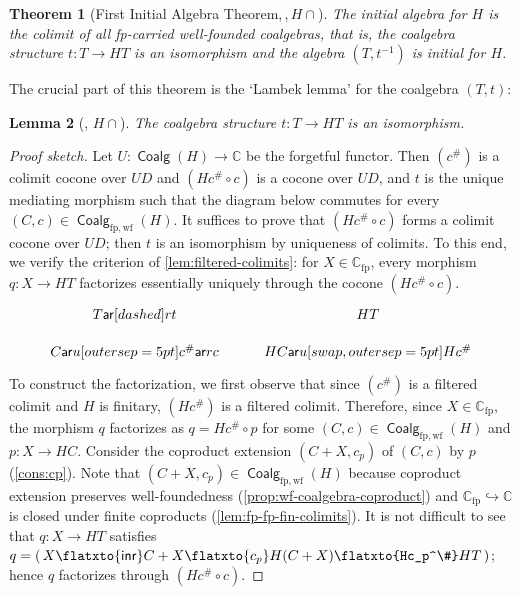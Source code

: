 \documentclass[10pt,a4paper]{article}
\newtheorem{theorem}{Theorem}[section]
\newtheorem{lemma}[theorem]{Lemma}
\theoremstyle{definition}
\theoremstyle{remark}
\numberwithin{equation}{section}
\providecommand{\oname}[1]{{\mathop{\mathsf{#1}}\xspace}}
\providecommand{\inr}{\oname{inr}}
\newcommand{\ar}{\mathsf{ar}}
\providecommand{\C}{}
\newcommand{\fp}{{\mathrm{fp}}}
\newcommand{\wf}{{\mathrm{wf}}}
\newcommand{\fwf}{\Coalg_{\fp,\wf}(H)}
\renewcommand{\C}{{\mathbb{C}}}
\DeclareMathOperator{\Coalg}{\mathsf{Coalg}}
\newcommand{\subto}{\hookrightarrow}
\newcommand{\injmono}{\ensuremath{\overset{\smash{\raisebox{-1pt}{\ensuremath{\scriptstyle+}}}}{\rightarrowtail}}}\newcommand{\hpresint}{\ensuremath{H\cap}\xspace}
\theoremstyle{plain}
\theoremstyle{definition}
\begin{document}
\begin{theorem}[First Initial Algebra Theorem,\,\smash{\injmono},\,\hpresint]\label{thm:wf-initial-algebra}
The initial algebra for $H$ is the colimit of all fp-carried well-founded coalgebras, that is, the coalgebra structure $t\colon T\to HT$ is an isomorphism and the algebra $(T,t^{-1})$ is initial for $H$.
\end{theorem}

The crucial part of this theorem is the `Lambek lemma' for the coalgebra $(T,t)$:
\begin{lemma}[\smash{\injmono}, \hpresint]\label{lem:t-iso-wf}
The coalgebra structure $t\colon T\to HT$ is an isomorphism.
\end{lemma}

\begin{proof}[Proof sketch]
Let $U\colon \Coalg(H)\to \C$ be the forgetful functor. Then $(c^\#)$ is a colimit cocone over $UD$ and $(Hc^\#\circ c)$ is a cocone over $UD$, and $t$ is the unique mediating morphism such that the diagram below commutes for every $(C,c)\in \fwf$. It suffices to prove that
  $(Hc^\#\circ c)$ forms a colimit cocone over $UD$; then $t$ is an isomorphism by uniqueness of colimits. To this end, we verify the criterion of \autoref{lem:filtered-colimits}: for $X\in \C_\fp$, every morphism $q\colon X \to HT$ factorizes essentially uniquely through the cocone $(Hc^\# \circ c)$.
\[  
\begin{tikzcd}[row sep=3mm,outer sep=0pt]
T \ar[dashed]{r}{t} & HT \\
C \ar{u}[outer sep=5pt]{c^\#} \ar{r}{c} & HC \ar{u}[swap,outer sep=5pt]{Hc^\#}
\end{tikzcd}
\]
To construct the factorization, we first observe that since $(c^\#)$ is a filtered colimit and $H$ is finitary, $(Hc^\#)$ is a filtered colimit. Therefore, since $X\in \C_\fp$, the morphism $q$ factorizes as $q=Hc^\# \circ p$ for some $(C,c)\in \Coalg_{\fp,\wf}(H)$ and $p\colon X\to HC$. Consider the coproduct extension $(C+X,c_p)$ of $(C,c)$ by $p$ (\autoref{cons:cp}). Note that $(C+X,c_p)\in \Coalg_{\fp,\wf}(H)$ because coproduct extension preserves well-foundedness (\autoref{prop:wf-coalgebra-coproduct}) and $\C_\fp\subto \C$ is closed under finite coproducts (\autoref{lem:fp-fp-fin-colimits}). It is not difficult to see that $q\colon X\to HT$ satisfies $q=(\,X \flatxto{\inr} C+X \flatxto{c_p}  H(C+X)\flatxto{Hc_p^\#}  HT\,)$; hence $q$ factorizes through $(Hc^\# \circ c)$.
\end{proof}
\end{document}
